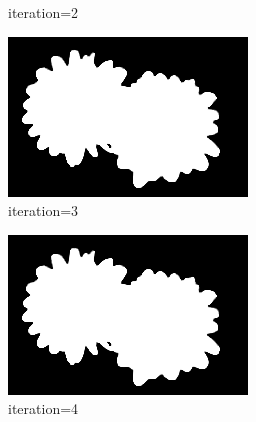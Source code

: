 \documentclass{article}
\begin{document}
\begin{figure}[t]
\begin{subfigure}[t]{0.19\textwidth}
\vspace{-0.6cm}
\caption{iteration=2}
\end{subfigure}
\begin{subfigure}[t]{0.19\textwidth}
\centering
\includegraphics[width=\textwidth]{./images/marginals_iter_3.png}
\vspace{-0.6cm}
\caption{iteration=3}
\end{subfigure}
\begin{subfigure}[t]{0.19\textwidth}
\centering
\includegraphics[width=\textwidth]{./images/marginals_iter_4.png}
\vspace{-0.6cm}
\caption{iteration=4}
\end{subfigure}
\begin{subfigure}[t]{0.19\textwidth}
\centering

\end{subfigure}
\end{figure}
\end{document}
